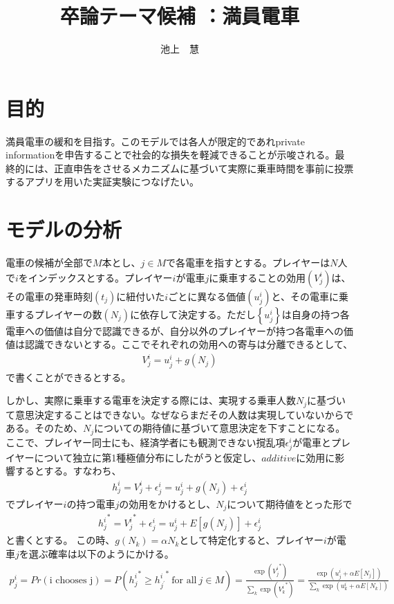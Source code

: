 \documentclass{jsarticle}
\begin{document}
\title{卒論テーマ候補 ：満員電車}
\author{池上　慧}
\maketitle

\section{目的}
満員電車の緩和を目指す。このモデルでは各人が限定的であれprivate informationを申告することで社会的な損失を軽減できることが示唆される。最終的には、正直申告をさせるメカニズムに基づいて実際に乗車時間を事前に投票するアプリを用いた実証実験につなげたい。

\section{モデルの分析}
電車の候補が全部で$M$本とし、$j \in M$で各電車を指すとする。プレイヤーは$N$人で$i$をインデックスとする。プレイヤー$i$が電車$j$に乗車することの効用$(V_j^i)$は、その電車の発車時刻$(t_j)$に紐付いた$i$ごとに異なる価値$(u_j^i)$と、その電車に乗車するプレイヤーの数$(N_j)$に依存して決定する。ただし$\left\{u_j^i\right\}$は自身の持つ各電車への価値は自分で認識できるが、自分以外のプレイヤーが持つ各電車への価値は認識できないとする。ここでそれぞれの効用への寄与は分離できるとして、
\begin{align*}
	V_j^i = u_j^i + g(N_j)
\end{align*}
で書くことができるとする。

しかし、実際に乗車する電車を決定する際には、実現する乗車人数$N_j$に基づいて意思決定することはできない。なぜならまだその人数は実現していないからである。そのため、$N_j$についての期待値に基づいて意思決定を下すことになる。ここで、プレイヤー同士にも、経済学者にも観測できない撹乱項$\epsilon_j^i$が電車とプレイヤーについて独立に第1種極値分布にしたがうと仮定し、$additive$に効用に影響するとする。すなわち、
\begin{align*}
	h_j^i = V_j^i + \epsilon_j^i = u_j^i + g(N_j) + \epsilon_j^i
\end{align*}
でプレイヤー$i$の持つ電車$j$の効用をかけるとし、$N_j$について期待値をとった形で
\begin{align*}
	{h_j^i}^* = {V_j^i}^* + \epsilon_j^i = u_j^i + E[g(N_j)] + \epsilon_j^i
\end{align*}
と書くとする。
この時、$g(N_k) = \alpha N_k$として特定化すると、プレイヤー$i$が電車$j$を選ぶ確率は以下のようにかける。
\begin{align*}
	p_j^i = Pr(\text{i chooses j}) = P({h_j^i}^* \geq {h_{j^{'}}^i}^*\ \text{for all}\ j \in M) = \frac{\exp({V_j^i}^*)}{\sum_k \exp({V_k^i}^*)} = \frac{\exp(u_j^i + \alpha E[N_j])}{\sum_k \exp(u_k^i + \alpha E[N_k])}
\end{align*}
\end{document}
